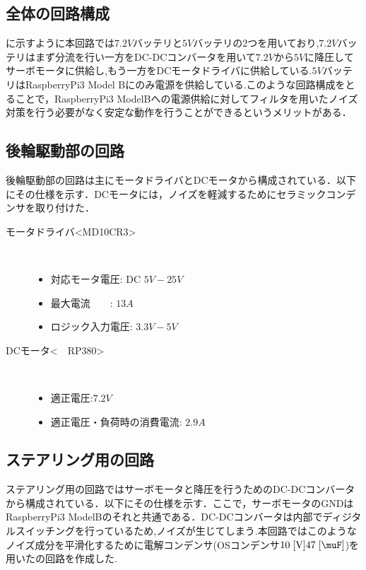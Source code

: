 \subsection{全体の回路構成}

に示すように本回路では$7.2\unit{V}$バッテリと$5\unit{V}$バッテリの2つを用いており,$7.2\unit{V}$バッテリはまず分流を行い一方をDC-DCコンバータを用いて$7.2\unit{V}$から$5\unit{V}$に降圧してサーボモータに供給し,もう一方をDCモータドライバに供給している.$5\unit{V}$バッテリはRaspberryPi3 Model Bにのみ電源を供給している.このような回路構成をとることで，RaspberryPi3    ModelBへの電源供給に対してフィルタを用いたノイズ対策を行う必要がなく安定な動作を行うことができるというメリットがある\cite{motor}．

\subsection{後輪駆動部の回路}
後輪駆動部の回路は主にモータドライバとDCモータから構成されている．以下にその仕様を示す．DCモータには，ノイズを軽減するためにセラミックコンデンサを取り付けた\cite{motor}．
\begin{description}
    \item[モータドライバ\textless MD10CR3\textgreater \cite{motordriver}]\mbox{}\\
    \vspace{-5mm}
        \begin{itemize}
            \item 対応モータ電圧: DC $5\unit{V}-25\unit{V}$
            \item 最大電流　　: $13\unit{A}$
            \item ロジック入力電圧: $3.3\unit{V}-5\unit{V}$
        \end{itemize}
     \item[DCモータ\textless　RP380\textgreater\cite{R380}]\mbox{}\\
     \vspace{-5mm}
         \begin{itemize}
            \item 適正電圧:$7.2\unit{V}$
            \item 適正電圧・負荷時の消費電流: $2.9\unit{A}$
        \end{itemize}
\end{description}

\newpage

\subsection{ステアリング用の回路}
ステアリング用の回路ではサーボモータと降圧を行うためのDC-DCコンバータから構成されている．以下にその仕様を示す．ここで，サーボモータのGNDはRaspberryPi3 ModelBのそれと共通である．DC-DCコンバータは内部でディジタルスイッチングを行っているため,ノイズが生じてしまう\cite{dcdc}.本回路ではこのようなノイズ成分を平滑化するために電解コンデンサ(OSコンデンサ$10\unit{V}47\unit{\muF}$)を用いたの回路を作成した\cite{dcdcconverter}.

